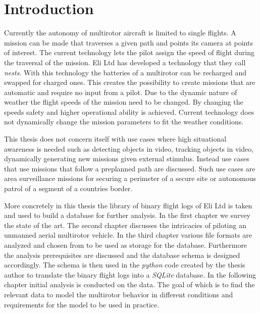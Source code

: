 \documentclass[12pt,oneside]{reedthesis}
\theoremstyle{definition}
\theoremstyle{definition}
\theoremstyle{definition}
\theoremstyle{remark}
\begin{document}
  \hypersetup{linkcolor=black}
  \setcounter{tocdepth}{2}
  \tableofcontents

  \listoffigures

  \listoftables

\mainmatter %
\pagestyle{fancyplain} %

\chapter*{Introduction}\label{introduction}

Currently the autonomy of multirotor aircraft is limited to single
flights. A mission can be made that traverses a given path and points
its camera at points of interest. The current technology lets the pilot
assign the speed of flight during the traversal of the mission. Eli Ltd
has developed a technology that they call \emph{nests}. With this
technology the batteries of a multirotor can be recharged and swapped
for charged ones. This creates the possibility to create missions that
are automatic and require no input from a pilot. Due to the dynamic
nature of weather the flight speeds of the mission need to be changed.
By changing the speeds safety and higher operational ability is
achieved. Current technology does not dynamically change the mission
parameters to fit the weather conditions.

This thesis does not concern itself with use cases where high
situational awareness is needed such as detecting objects in video,
tracking objects in video, dynamically generating new missions given
external stimulus. Instead use cases that use missions that follow a
preplanned path are discussed. Such use cases are area surveillance
missions for securing a perimeter of a secure site or autonomous patrol
of a segment of a countries border.

More concretely in this thesis the library of binary flight logs of Eli
Ltd is taken and used to build a database for further analysis. In the
first chapter we survey the state of the art. The second chapter
discusses the intricacies of piloting an unmanned aerial multirotor
vehicle. In the third chapter various file formats are analyzed and
chosen from to be used as storage for the database. Furthermore the
analysis prerequisites are discussed and the database schema is designed
accordingly. The schema is then used in the \emph{python} code created
by the thesis author to translate the binary flight logs into a
\emph{SQLite} database. In the following chapter initial analysis is
conducted on the data. The goal of which is to find the relevant data to
model the multirotor behavior in different conditions and requirements
for the model to be used in practice.
\end{document}
